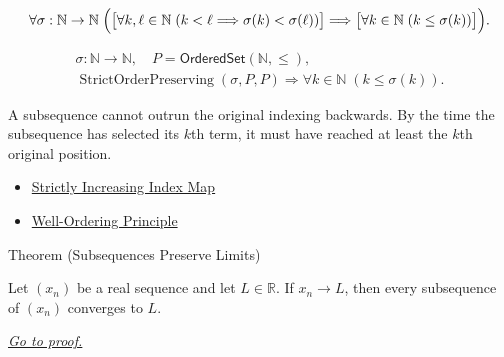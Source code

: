 \begin{remark*}
\[
\forall \sigma:\mathbb{N}\to\mathbb{N}\;
\Bigl(
  \bigl[\forall k,\ell\in\mathbb{N}\;(k<\ell\Longrightarrow \sigma(k)<\sigma(\ell))\bigr]
  \Longrightarrow
  \bigl[\forall k\in\mathbb{N}\;(k\le\sigma(k))\bigr]
\Bigr).
\]
\end{remark*}

\begin{remark*}
\[
\begin{gathered}
\sigma\colon\mathbb{N}\to\mathbb{N},\quad
P=\mathsf{OrderedSet}(\mathbb{N},\leq),\\
\operatorname{StrictOrderPreserving}(\sigma,P,P)
\Longrightarrow
\forall k\in\mathbb{N}\;(k\le\sigma(k)).
\end{gathered}
\]
\end{remark*}

\begin{remark*}[Interpretation]
A subsequence cannot outrun the original indexing backwards. By the time the
subsequence has selected its $k$th term, it must have reached at least the
$k$th original position.
\end{remark*}

\begin{dependencies}
\begin{itemize}
  \item \hyperref[def:strictly-increasing-index-map]{Strictly Increasing Index Map}
  \item \hyperref[thm:well-ordering-principle]{Well-Ordering Principle}
\end{itemize}
\end{dependencies}


\begin{theorembox}{Theorem (Subsequences Preserve Limits)}
\begin{theorem}
\label{thm:subsequences-preserve-limits}
Let $(x_n)$ be a real sequence and let $L\in\mathbb{R}$. If $x_n\to L$,
then every subsequence of $(x_n)$ converges to $L$.

\smallskip
\noindent
\hyperref[prf:subsequences-preserve-limits]{\textit{Go to proof.}}
\end{theorem}
\end{theorembox}

